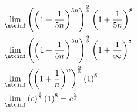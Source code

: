 
	
\begin{align}
    \lim_{\ntoinf}& \left( \left( 1 + \frac{1}{5n} \right)^{5n} \right)^{\frac{9}{5}}
    \left( 1 + \frac{1}{5n} \right)^{8} \\
    \lim_{\ntoinf}& \left( \left( 1 + \frac{1}{5n} \right)^{5n} \right)^{\frac{9}{5}}
    \left( 1 + \frac{1}{\infty} \right)^{8} \\
    \lim_{\ntoinf}& \left( \left( 1 + \frac{1}{n} \right)^{n} \right)^{\frac{9}{5}}
    \left( 1 \right)^8 \\
    \lim_{\ntoinf}& \left( e \right)^{\frac{9}{5}}
    \left( 1 \right)^8 = e^{\frac{9}{5}} \\
\end{align}


\pagebreak
